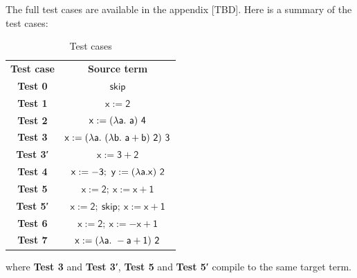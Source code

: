\documentclass[12pt,a4paper]{report}
\theoremstyle{definition}
\begin{document}
    The full test cases are available in the appendix [TBD]. Here is a summary of the test cases:
    \begin{table}[H]
        \centering
        \begin{tabular}{| c | c |}
            \hline
            \textbf{Test case} & \textbf{Source term} \\
            \hhline{|=|=|}
            \textbf{Test 0} & $\mathsf{skip}$ \\
            \hline
            \textbf{Test 1} & $\mathsf{x := 2}$ \\
            \hline
            \textbf{Test 2} & $\mathsf{x := (\mathnormal{\lambda} a.\ a)\ 4}$ \\
            \hline
            \textbf{Test 3} & $\mathsf{x := (\mathnormal{\lambda} a.\ (\mathnormal{\lambda} b.\ a+b)\ 2)\ 3}$ \\
            \hline
            \textbf{Test 3′} & $\mathsf{x := 3 + 2}$ \\
            \hline
            \textbf{Test 4} & $\mathsf{x := -3;\ y := (\mathnormal{\lambda} a. x)\ 2}$ \\
            \hline
            \textbf{Test 5} & $\mathsf{x := 2;\ x := x + 1}$ \\
            \hline
            \textbf{Test 5′} & $\mathsf{x := 2;\ skip;\ x := x + 1}$ \\
            \hline
            \textbf{Test 6} & $\mathsf{x := 2;\ x := -x + 1}$ \\
            \hline
            \textbf{Test 7} & $\mathsf{x := (\mathnormal{\lambda} a.\ -a+1)\ 2}$ \\
            \hline
        \end{tabular}
        \caption{Test cases}
        \label{tab: test_cases}
    \end{table}
    where \textbf{Test 3} and \textbf{Test 3′}, \textbf{Test 5} and \textbf{Test 5′} compile to the same target term. 
    
\end{document}
